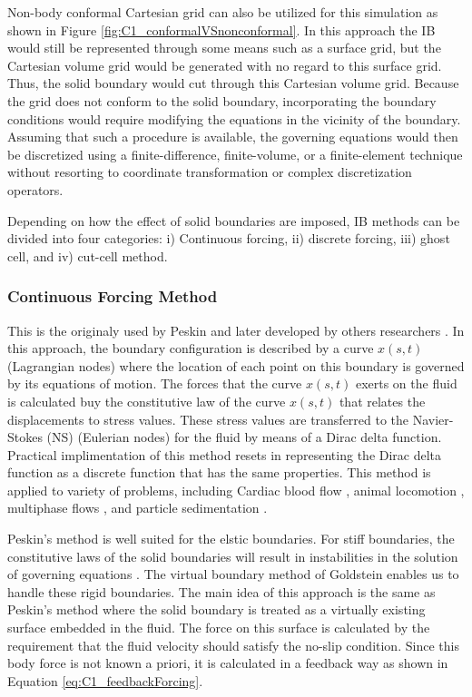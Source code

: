 Non-body conformal Cartesian grid can also be utilized for this simulation as shown in Figure \ref{fig:C1_conformalVSnonconformal}. In this approach the IB would still be represented through some means such as a surface grid, but the Cartesian volume grid would be generated with no regard to this surface grid. Thus, the solid boundary would cut through this Cartesian volume grid. Because the grid does not conform to the solid boundary, incorporating the boundary conditions would require modifying the equations in the vicinity of the boundary. Assuming that such a procedure is available, the governing equations would then be discretized using a finite-difference, finite-volume, or a finite-element technique without resorting to coordinate transformation or complex discretization operators.

Depending on how the effect of solid boundaries are imposed, IB methods can be divided into four categories: i) Continuous forcing, ii) discrete forcing, iii) ghost cell, and iv) cut-cell method.

\subsubsection{Continuous Forcing Method}
This is the originaly used by Peskin \cite{peskin1977numerical} and later developed by others researchers \cite{saiki1996numerical, zhu2003interaction, beyer1992analysis}. In this approach, the boundary configuration is described by a curve $x(s,t)$ (Lagrangian nodes) where the location of each point on this boundary is governed by its equations of motion. The forces that the curve $x(s,t)$ exerts on the fluid is calculated buy the constitutive law of the curve $x(s,t)$ that relates the displacements to stress values. These stress values are transferred to the Navier-Stokes (NS) (Eulerian nodes) for the fluid by means of a Dirac delta function. Practical implimentation of this method resets in representing the Dirac delta function as a discrete function that has the same properties. This method is applied to variety of problems, including Cardiac blood flow \cite{peskin1989three}, animal locomotion \cite{fauci1988computational}, multiphase flows \cite{kempe2015imposing}, and particle sedimentation \cite{uhlmann2005immersed}.

Peskin's method is well suited for the elstic boundaries. For stiff boundaries, the constitutive laws of the solid boundaries will result in instabilities in the solution of governing equations \cite{mittal2005immersed}. The virtual boundary method of Goldstein \cite{goldstein1993modeling} enables us to handle these rigid boundaries. The main idea of this approach is the same as Peskin's method where the solid boundary is treated as a virtually existing surface embedded in the fluid. The force on this surface is calculated by the requirement that the fluid velocity should satisfy the no-slip condition. Since this body force is not known a priori, it is calculated in a feedback way as shown in Equation \eqref{eq:C1_feedbackForcing}.

